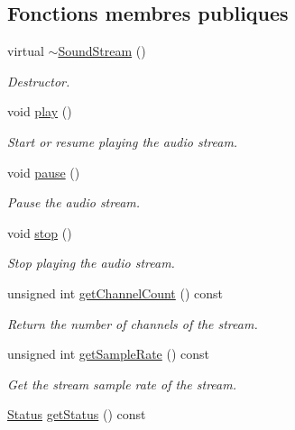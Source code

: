 \subsection*{Fonctions membres publiques}
\begin{DoxyCompactItemize}
\item 
\mbox{\label{classsf_1_1SoundStream_a1fafb9f1ca572d23d7d6a17921860d85}} 
virtual \hyperlink{classsf_1_1SoundStream_a1fafb9f1ca572d23d7d6a17921860d85}{$\sim$\+Sound\+Stream} ()
\begin{DoxyCompactList}\small\item\em Destructor. \end{DoxyCompactList}\item 
void \hyperlink{classsf_1_1SoundStream_afdc08b69cab5f243d9324940a85a1144}{play} ()
\begin{DoxyCompactList}\small\item\em Start or resume playing the audio stream. \end{DoxyCompactList}\item 
void \hyperlink{classsf_1_1SoundStream_a932ff181e661503cad288b4bb6fe45ca}{pause} ()
\begin{DoxyCompactList}\small\item\em Pause the audio stream. \end{DoxyCompactList}\item 
void \hyperlink{classsf_1_1SoundStream_a16cc6a0404b32e42c4dce184bb94d0f4}{stop} ()
\begin{DoxyCompactList}\small\item\em Stop playing the audio stream. \end{DoxyCompactList}\item 
unsigned int \hyperlink{classsf_1_1SoundStream_a1f70933912dd9498f4dc99feefed27f3}{get\+Channel\+Count} () const
\begin{DoxyCompactList}\small\item\em Return the number of channels of the stream. \end{DoxyCompactList}\item 
unsigned int \hyperlink{classsf_1_1SoundStream_a7da448dc40d81a33b8dc555fbf0d3fbf}{get\+Sample\+Rate} () const
\begin{DoxyCompactList}\small\item\em Get the stream sample rate of the stream. \end{DoxyCompactList}\item 
\hyperlink{classsf_1_1SoundSource_ac43af72c98c077500b239bc75b812f03}{Status} \hyperlink{classsf_1_1SoundStream_a64a8193ed728da37c115c65de015849f}{get\+Status} () const

\end{DoxyCompactItemize}
